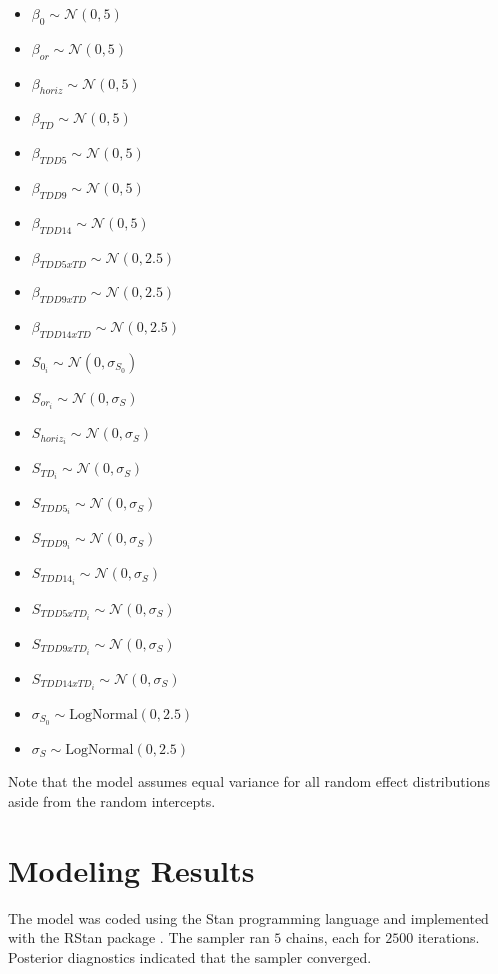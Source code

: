 \begin{itemize}
    \item $\beta_{0} \sim \mathcal{N}(0,5)$
    \item $\beta_{or} \sim \mathcal{N}(0,5)$
    \item $\beta_{horiz} \sim \mathcal{N}(0,5)$
    \item $\beta_{TD} \sim \mathcal{N}(0,5)$
    \item $\beta_{TDD5} \sim \mathcal{N}(0,5)$
    \item $\beta_{TDD9} \sim \mathcal{N}(0,5)$
    \item $\beta_{TDD14} \sim \mathcal{N}(0,5)$
    \item $\beta_{TDD5xTD} \sim \mathcal{N}(0,2.5)$
    \item $\beta_{TDD9xTD} \sim \mathcal{N}(0,2.5)$
    \item $\beta_{TDD14xTD} \sim \mathcal{N}(0,2.5)$
    \item $S_{0_{i}} \sim \mathcal{N}(0, \sigma_{S_0})$
    \item $S_{or_{i}} \sim \mathcal{N}(0, \sigma_{S})$
    \item $S_{horiz_{i}} \sim \mathcal{N}(0, \sigma_{S})$
    \item $S_{TD_{i}} \sim \mathcal{N}(0, \sigma_{S})$
    \item $S_{TDD5_{i}} \sim \mathcal{N}(0, \sigma_{S})$
    \item $S_{TDD9_{i}} \sim \mathcal{N}(0, \sigma_{S})$
    \item $S_{TDD14_{i}} \sim \mathcal{N}(0, \sigma_{S})$
    \item $S_{TDD5xTD_{i}} \sim \mathcal{N}(0, \sigma_{S})$
    \item $S_{TDD9xTD_{i}} \sim \mathcal{N}(0, \sigma_{S})$
    \item $S_{TDD14xTD_{i}} \sim \mathcal{N}(0, \sigma_{S})$
    \item $\sigma_{S_{0}} \sim \mathrm{LogNormal}(0,2.5)$
    \item $\sigma_{S} \sim \mathrm{LogNormal}(0,2.5)$
\end{itemize}

Note that the model assumes equal variance for all random effect distributions aside from the random intercepts.

\section{Modeling Results}
The model was coded using the Stan programming language \parencite{carpenter2017stan} and implemented with the RStan package \parencite{rstan}. The sampler ran $5$ chains, each for $2500$ iterations. Posterior diagnostics indicated that the sampler converged.

